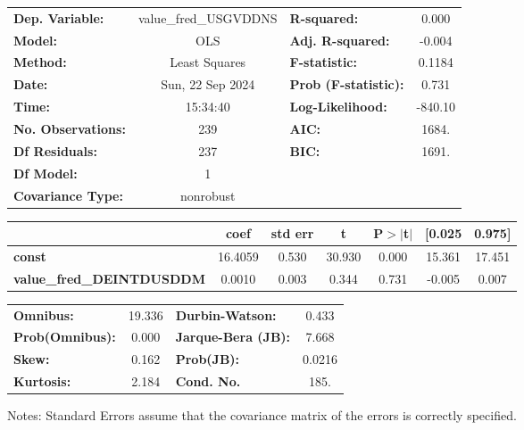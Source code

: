 \begin{center}
\begin{tabular}{lclc}
\toprule
\textbf{Dep. Variable:}           & value\_fred\_USGVDDNS & \textbf{  R-squared:         } &     0.000   \\
\textbf{Model:}                   &          OLS          & \textbf{  Adj. R-squared:    } &    -0.004   \\
\textbf{Method:}                  &     Least Squares     & \textbf{  F-statistic:       } &    0.1184   \\
\textbf{Date:}                    &    Sun, 22 Sep 2024   & \textbf{  Prob (F-statistic):} &    0.731    \\
\textbf{Time:}                    &        15:34:40       & \textbf{  Log-Likelihood:    } &   -840.10   \\
\textbf{No. Observations:}        &            239        & \textbf{  AIC:               } &     1684.   \\
\textbf{Df Residuals:}            &            237        & \textbf{  BIC:               } &     1691.   \\
\textbf{Df Model:}                &              1        & \textbf{                     } &             \\
\textbf{Covariance Type:}         &       nonrobust       & \textbf{                     } &             \\
\bottomrule
\end{tabular}
\begin{tabular}{lcccccc}
                                  & \textbf{coef} & \textbf{std err} & \textbf{t} & \textbf{P$> |$t$|$} & \textbf{[0.025} & \textbf{0.975]}  \\
\midrule
\textbf{const}                    &      16.4059  &        0.530     &    30.930  &         0.000        &       15.361    &       17.451     \\
\textbf{value\_fred\_DEINTDUSDDM} &       0.0010  &        0.003     &     0.344  &         0.731        &       -0.005    &        0.007     \\
\bottomrule
\end{tabular}
\begin{tabular}{lclc}
\textbf{Omnibus:}       & 19.336 & \textbf{  Durbin-Watson:     } &    0.433  \\
\textbf{Prob(Omnibus):} &  0.000 & \textbf{  Jarque-Bera (JB):  } &    7.668  \\
\textbf{Skew:}          &  0.162 & \textbf{  Prob(JB):          } &   0.0216  \\
\textbf{Kurtosis:}      &  2.184 & \textbf{  Cond. No.          } &     185.  \\
\bottomrule
\end{tabular}
\end{center}

Notes: \newline
 [1] Standard Errors assume that the covariance matrix of the errors is correctly specified.